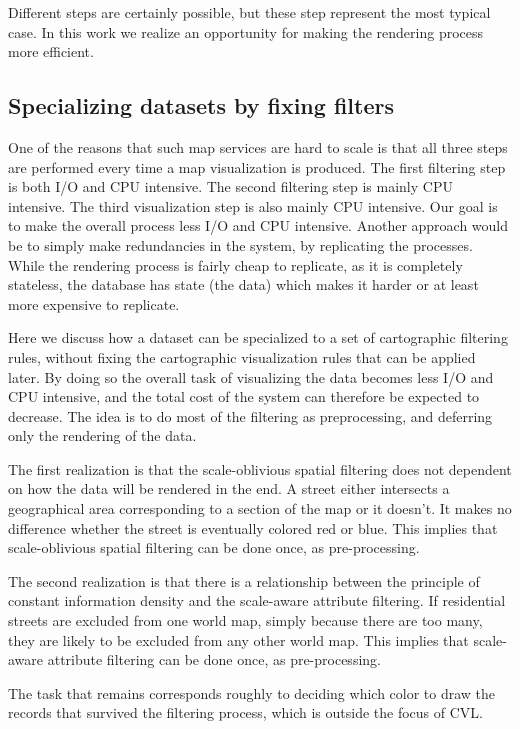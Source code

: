 Different steps are certainly possible, but these step represent the most typical case. In this work we realize an opportunity for making the rendering process more efficient. 

\subsection{Specializing datasets by fixing filters}
One of the reasons that such map services are hard to scale is that all three steps are performed every time a map visualization is produced. The first filtering step is both I/O and CPU intensive. The second filtering step is mainly CPU intensive. The third visualization step is also mainly CPU intensive. Our goal is to make the overall process less I/O and CPU intensive. Another approach would be to simply make redundancies in the system, by replicating the processes. While the rendering process is fairly cheap to replicate, as it is completely stateless, the database has state (the data) which makes it harder or at least more expensive to replicate.

Here we discuss how a dataset can be specialized to a set of cartographic filtering rules, without fixing the cartographic visualization rules that can be applied later. By doing so the overall task of visualizing the data becomes less I/O and CPU intensive, and the total cost of the system can therefore be expected to decrease. The idea is to do most of the filtering as preprocessing, and deferring only the rendering of the data.

The first realization is that the scale-oblivious spatial filtering does not dependent on how the data will be rendered in the end. A street either intersects a geographical area corresponding to a section of the map or it doesn't. It makes no difference whether the street is eventually colored red or blue. This implies that scale-oblivious spatial filtering can be done once, as pre-processing.

The second realization is that there is a relationship between the principle of constant information density and the scale-aware attribute filtering. If residential streets are excluded from one world map, simply because there are too many, they are likely to be excluded from any other world map. This implies that scale-aware attribute filtering can be done once, as pre-processing.

The task that remains corresponds roughly to deciding which color to draw the records that survived the filtering process, which is outside the focus of CVL.


